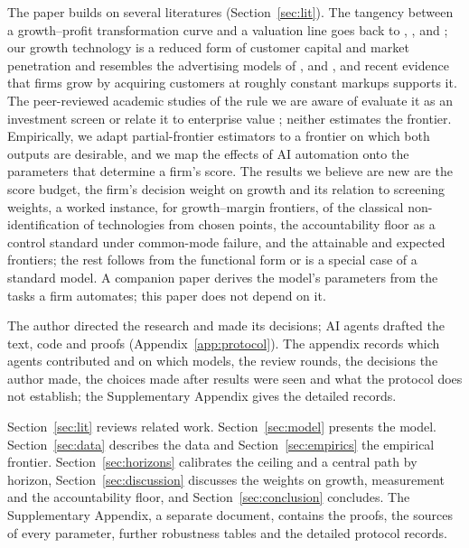 The paper builds on several literatures (Section~\ref{sec:lit}). The tangency between a growth--profit transformation curve and a valuation line goes back to \citet{marris1964economic}, \citet{solow1971some}, \citet{wood1975theory} and \citet{odagiri1981theory}; our growth technology is a reduced form of customer capital and market penetration \citep{arkolakis2010market,gourio2014customer} and resembles the advertising models of \citet{vidale1957operations}, \citet{nerlove1962optimal} and \citet{sethi1973optimal}, and recent evidence that firms grow by acquiring customers at roughly constant markups \citep{fitzgerald2024how,argente2025how} supports it. The peer-reviewed academic studies of the rule we are aware of evaluate it as an investment screen \citep{lee2024evaluating} or relate it to enterprise value \citep{nei2026enterprise}; neither estimates the frontier. Empirically, we adapt partial-frontier estimators \citep{cazals2002nonparametric,aragon2005nonparametric} to a frontier on which both outputs are desirable, and we map the effects of AI automation \citep{aghion2019artificial,acemoglu2025simple,babina2024artificial} onto the parameters that determine a firm's score. The results we believe are new are the score budget, the firm's decision weight on growth and its relation to screening weights, a worked instance, for growth--margin frontiers, of the classical non-identification of technologies from chosen points, the accountability floor as a control standard under common-mode failure, and the attainable and expected frontiers; the rest follows from the functional form or is a special case of a standard model. A companion paper \citep{murthy2026transformation} derives the model's parameters from the tasks a firm automates; this paper does not depend on it.

The author directed the research and made its decisions; AI agents drafted the text, code and proofs (Appendix~\ref{app:protocol}). The appendix records which agents contributed and on which models, the review rounds, the decisions the author made, the choices made after results were seen and what the protocol does not establish; the Supplementary Appendix gives the detailed records.

Section~\ref{sec:lit} reviews related work. Section~\ref{sec:model} presents the model. Section~\ref{sec:data} describes the data and Section~\ref{sec:empirics} the empirical frontier. Section~\ref{sec:horizons} calibrates the ceiling and a central path by horizon, Section~\ref{sec:discussion} discusses the weights on growth, measurement and the accountability floor, and Section~\ref{sec:conclusion} concludes. The Supplementary Appendix, a separate document, contains the proofs, the sources of every parameter, further robustness tables and the detailed protocol records.

